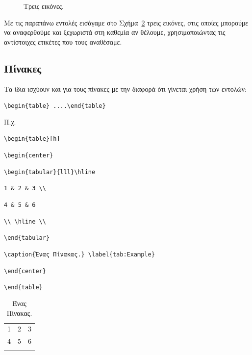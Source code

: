 \begin{figure}[t]
\begin{subfigure}[t]{0.3\textwidth}
		\caption{}
		\label{subfig:ThreeBirdsC}
	\end{subfigure}
	\caption{Τρεις εικόνες.}
	\label{fig:ThreeBirds}
\end{figure}

Με τις παραπάνω εντολές εισάγαμε στο Σχήμα~\ref{fig:ThreeBirds} τρεις εικόνες, στις οποίες μπορούμε να αναφερθούμε και ξεχωριστά στη καθεμία αν θέλουμε, χρησιμοποιώντας τις αντίστοιχες ετικέτες που τους αναθέσαμε.


\subsection{Πίνακες}
\label{subsec:Tables}

Τα ίδια ισχύουν και για τους πίνακες με την διαφορά ότι γίνεται
χρήση των εντολών:

\y \bs\s\s

\verb"\begin{table} ....\end{table}"

\chl Π.χ.

\noindent\verb"\begin{table}[h]"

\noindent\verb"\begin{center}"

\noindent\verb"\begin{tabular}{lll}\hline"

\noindent\verb"1 & 2 & 3 \\"

\noindent\verb"4 & 5 & 6"

\noindent\verb"\\ \hline \\"

\noindent\verb"\end{tabular}"

\noindent\verb"\caption{Ένας Πίνακας.} \label{tab:Example}"

\noindent\verb"\end{center}"

\noindent\verb"\end{table}"

\begin{table}[h]
\begin{center}
\caption{Ένας Πίνακας.} \label{tab:Example}
\begin{tabular}{lll}\hline
1 & 2 & 3 \\
4 & 5 & 6
\\ \hline \\
\end{tabular}
\end{center}
\end{table}

